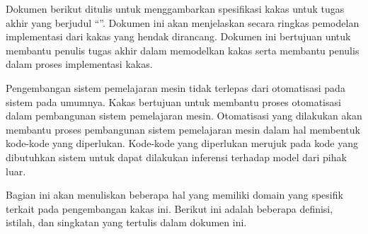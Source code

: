 \label{appendix:srs}



Dokumen berikut ditulis untuk menggambarkan spesifikasi kakas untuk tugas akhir yang berjudul ``\thesistitle''.
Dokumen ini akan menjelaskan secara ringkas pemodelan implementasi dari kakas yang hendak dirancang.
Dokumen ini bertujuan untuk membantu penulis tugas akhir dalam memodelkan kakas serta membantu penulis dalam proses implementasi kakas.


Pengembangan sistem pemelajaran mesin tidak terlepas dari otomatisasi pada sistem pada umumnya.
Kakas bertujuan untuk membantu proses otomatisasi dalam pembangunan sistem pemelajaran mesin.
Otomatisasi yang dilakukan akan membantu proses pembangunan sistem pemelajaran mesin dalam hal membentuk kode-kode yang diperlukan.
Kode-kode yang diperlukan merujuk pada kode yang dibutuhkan sistem untuk dapat dilakukan inferensi terhadap model dari pihak luar.


Bagian ini akan menuliskan beberapa hal yang memiliki domain yang spesifik terkait pada pengembangan kakas ini.
Berikut ini adalah beberapa definisi, istilah, dan singkatan yang tertulis dalam dokumen ini.

